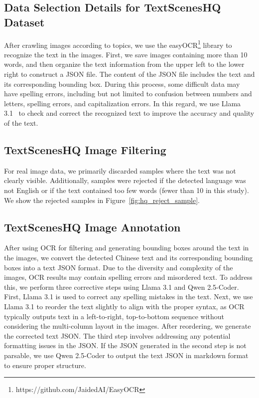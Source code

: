\subsection{Data Selection Details for TextScenesHQ Dataset}
After crawling images according to topics, we use the easyOCR\footnote{https://github.com/JaidedAI/EasyOCR} library to recognize the text in the images. 
First, we save images containing more than 10 words, and then organize the text information from the upper left to the lower right to construct a JSON file. 
The content of the JSON file includes the text and its corresponding bounding box.
During this process, some difficult data may have spelling errors, including but not limited to confusion between numbers and letters, spelling errors, and capitalization errors. 
In this regard, we use Llama 3.1~\cite{llama3h} to check and correct the recognized text to improve the accuracy and quality of the text.



\subsection{TextScenesHQ Image Filtering}
For real image data, we primarily discarded samples where the text was not clearly visible. 
Additionally, samples were rejected if the detected language was not English or if the text contained too few words (fewer than 10 in this study).
We show the rejected samples in Figure~\ref{fig:hq_reject_sample}.




\subsection{TextScenesHQ Image Annotation}
\label{sec:appendix_textsceneshq_annotation}
After using OCR for filtering and generating bounding boxes around the text in the images, we convert the detected Chinese text and its corresponding bounding boxes into a text JSON format. Due to the diversity and complexity of the images, OCR results may contain spelling errors and misordered text. To address this, we perform three corrective steps using Llama 3.1 and Qwen 2.5-Coder. First, Llama 3.1 is used to correct any spelling mistakes in the text. Next, we use Llama 3.1 to reorder the text slightly to align with the proper syntax, as OCR typically outputs text in a left-to-right, top-to-bottom sequence without considering the multi-column layout in the images. After reordering, we generate the corrected text JSON. The third step involves addressing any potential formatting issues in the JSON. If the JSON generated in the second step is not parsable, we use Qwen 2.5-Coder to output the text JSON in markdown format to ensure proper structure.

